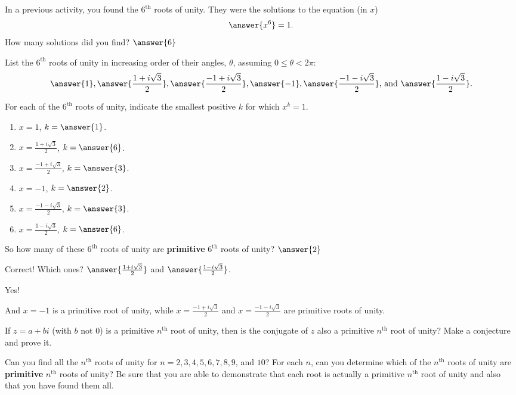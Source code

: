 \documentclass[space,nooutcomes]{ximera}
\begin{document}
\begin{problem}
In a previous activity, you found the $6^\text{th}$ roots of unity.  They were the solutions to the equation (in $x$)
\[
\answer{x^6} = 1.  
\]
How many solutions did you find?  $\answer{6}$
\begin{problem}
List the $6^\text{th}$ roots of unity in increasing order of their angles, $\theta$, assuming $0\le \theta<2\pi$: 
\[
\answer{1}, \answer{\frac{1+i\sqrt{3}}{2}}, \answer{\frac{-1+i\sqrt{3}}{2}}, 
\answer{-1}, \answer{\frac{-1-i\sqrt{3}}{2}}\text{, and }\answer{\frac{1-i\sqrt{3}}{2}}. 
\]
\begin{problem}
For each of the $6^\text{th}$ roots of unity, indicate the smallest positive $k$ for which $x^k = 1$.  
\begin{enumerate}
\item $x=1$, $k=\answer{1}$.  
\item $x=\frac{1+i\sqrt{3}}{2}$, $k=\answer{6}$.
\item $x=\frac{-1+i\sqrt{3}}{2}$, $k=\answer{3}$.
\item $x=-1$, $k=\answer{2}$.  
\item $x=\frac{-1-i\sqrt{3}}{2}$, $k=\answer{3}$.
\item $x=\frac{1-i\sqrt{3}}{2}$, $k=\answer{6}$.
\end{enumerate}
So how many of these $6^\text{th}$ roots of unity are \textbf{primitive} $6^\text{th}$ roots of unity?  
$\answer{2}$
\begin{problem}
Correct!  Which ones?  $\answer{\frac{1+i\sqrt{3}}{2}}$ and $\answer{\frac{1-i\sqrt{3}}{2}}$.  
\begin{problem}
Yes!  

And $x=-1$ is a primitive  root of unity,  
while $x=\frac{-1+i\sqrt{3}}{2}$ and $x=\frac{-1-i\sqrt{3}}{2}$ are primitive  roots of unity. 
\end{problem}
\end{problem}
\end{problem}
\end{problem}
\end{problem}

\begin{problem}
If $z = a + bi$ (with $b$ not $0$) is a primitive $n^\text{th}$ root of unity, then is the conjugate of $z$ also a primitive $n^\text{th}$ root of unity?  Make a conjecture and prove it.
\vfill 
\end{problem}


\begin{problem}
Can you find all the $n^\text{th}$ roots of unity for $n = 2, 3, 4, 5, 6, 7, 8, 9$, and $10$?  For each $n$, can you determine which of the $n^\text{th}$ roots of unity are \textbf{primitive} $n^\text{th}$ roots of unity?  Be sure that you are able to demonstrate that each root is actually a primitive $n^\text{th}$ root of unity and also that you have found them all.  
\end{problem}
\end{document}
